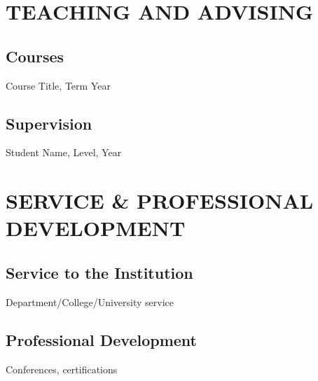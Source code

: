 \documentclass[a4paper,9pt]{extarticle}
\begin{document}
\section*{TEACHING AND ADVISING}
    \subsection*{Courses}
        Course Title, Term Year
    \subsection*{Supervision}
        Student Name, Level, Year

\section*{SERVICE \& PROFESSIONAL DEVELOPMENT}
    \subsection*{Service to the Institution}
        Department/College/University service
    \subsection*{Professional Development}
        Conferences, certifications
\end{document}
